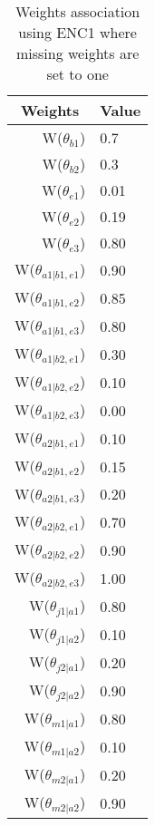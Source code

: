 \begin{table}[]
\centering
\caption{Weights association using ENC1 where missing weights are set to one}
\label{weightsEnc1}
\begin{tabular}{rl}
\hline
\multicolumn{1}{c}{Weights} & \multicolumn{1}{c}{Value} \\ \hline
W(\(\theta_{b1}\)) & 0.7 \\ 
W(\(\theta_{b2}\)) & 0.3 \\ 
W(\(\theta_{e1}\)) & 0.01 \\ 
W(\(\theta_{e2}\)) & 0.19 \\ 
W(\(\theta_{e3}\)) & 0.80 \\ 
W(\(\theta_{a1|b1,e1}\)) & 0.90 \\
W(\(\theta_{a1|b1,e2}\)) & 0.85 \\
W(\(\theta_{a1|b1,e3}\)) & 0.80 \\
W(\(\theta_{a1|b2,e1}\)) & 0.30 \\
W(\(\theta_{a1|b2,e2}\)) & 0.10 \\
W(\(\theta_{a1|b2,e3}\)) & 0.00 \\
W(\(\theta_{a2|b1,e1}\)) & 0.10 \\
W(\(\theta_{a2|b1,e2}\)) & 0.15 \\
W(\(\theta_{a2|b1,e3}\)) & 0.20 \\
W(\(\theta_{a2|b2,e1}\)) & 0.70 \\
W(\(\theta_{a2|b2,e2}\)) & 0.90 \\
W(\(\theta_{a2|b2,e3}\)) & 1.00 \\
W(\(\theta_{j1|a1}\)) & 0.80 \\
W(\(\theta_{j1|a2}\)) & 0.10 \\
W(\(\theta_{j2|a1}\)) & 0.20 \\
W(\(\theta_{j2|a2}\)) & 0.90 \\
W(\(\theta_{m1|a1}\)) & 0.80 \\
W(\(\theta_{m1|a2}\)) & 0.10 \\
W(\(\theta_{m2|a1}\)) & 0.20 \\
W(\(\theta_{m2|a2}\)) & 0.90
\end{tabular}
\end{table}